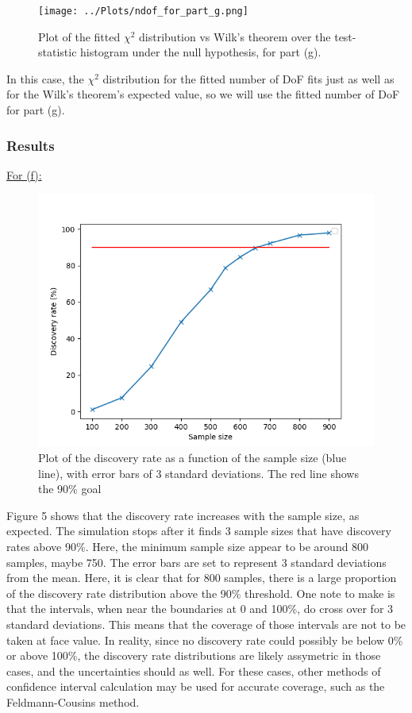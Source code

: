 \documentclass[12pt]{report} %
\begin{document}
\begin{figure}[t]
    \centering
    \texttt{[image: ../Plots/ndof\_for\_part\_g.png]}
    \captionsetup{margin=1.3cm}
    \caption[width=0.2\pdfpagewidth]{Plot of the fitted $\chi^{2}$ distribution vs Wilk's theorem over the test-statistic histogram under the null hypothesis, for part (g).}
\end{figure}
\newpage
In this case, the $\chi^{2}$ distribution for the fitted number of DoF fits just as well as for the Wilk's theorem's expected value, so we will use the fitted number of DoF for part (g).

\subsubsection*{Results}

\underline{For (f):}

\begin{figure}[htb]
    \centering
    \includegraphics[width=\textwidth]{../Plots/plot_f.png}
    \captionsetup{margin=1.3cm}
    \caption[width=0.2\pdfpagewidth]{Plot of the discovery rate as a function of the sample size (blue line), with error bars of 3 standard deviations. The red line shows the 90\% goal}
\end{figure}
\vspace{1\baselineskip}
Figure 5 shows that the discovery rate increases with the sample size, as expected. The simulation stops after it finds 3 sample sizes that have discovery rates above 90\%. Here, the minimum sample size appear to be around 800 samples, maybe 750. The error bars are set to represent 3 standard deviations from the mean. Here, it is clear that for 800 samples, there is a large proportion of the discovery rate distribution above the 90\% threshold. One note to make is that the intervals, when near the boundaries at 0 and 100\%, do cross over for 3 standard deviations. This means that the coverage of those intervals are not to be taken at face value. In reality, since no discovery rate could possibly be below 0\% or above 100\%, the discovery rate distributions are likely assymetric in those cases, and the uncertainties should as well. For these cases, other methods of confidence interval calculation may be used for accurate coverage, such as the Feldmann-Cousins method\cite{PhysRevD.57.3873}. 
\end{document}
